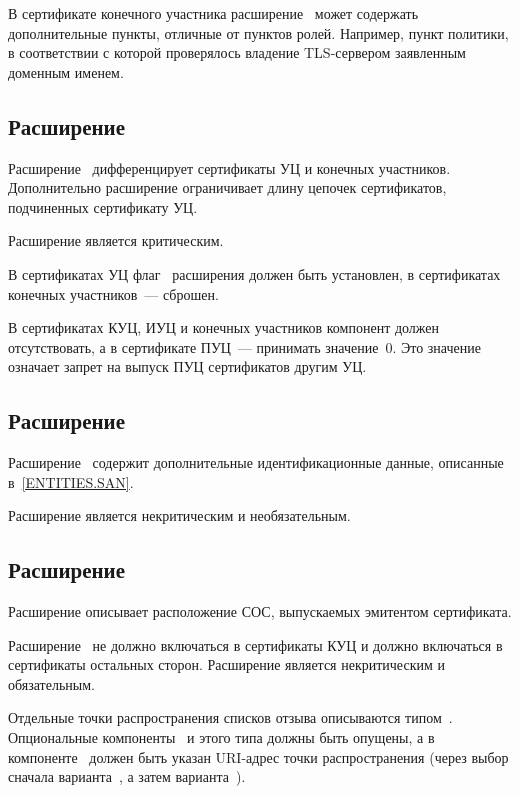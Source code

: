В сертификате конечного участника расширение~ может
содержать дополнительные пункты, отличные от пунктов ролей. Например, пункт
политики, в соответствии с которой проверялось владение TLS-сервером заявленным
доменным именем.

\subsection{Расширение }\label{FMT.Ext.BC}

Расширение~ дифференцирует сертификаты УЦ и
конечных участников. Дополнительно расширение ограничивает 
длину цепочек сертификатов, подчиненных сертификату УЦ.

Расширение  является критическим.

В сертификатах УЦ флаг~ расширения должен быть 
установлен, в сертификатах конечных участников~--- сброшен. 

В сертификатах КУЦ, ИУЦ и конечных участников компонент 
 должен отсутствовать,
а в сертификате ПУЦ~--- принимать значение~0. 
Это значение означает запрет на выпуск ПУЦ сертификатов 
другим УЦ. 

\subsection{Расширение }\label{FMT.Ext.SAN}

Расширение~ содержит дополнительные 
идентификационные данные, описанные в~\ref{ENTITIES.SAN}. 

Расширение является некритическим и необязательным.

\subsection{Расширение }\label{FMT.Ext.CDP}

Расширение  описывает расположение СОС, 
выпускаемых эмитентом сертификата. 

Расширение~ 
не должно включаться в сертификаты КУЦ и должно включаться в
сертификаты остальных сторон. Расширение является некритическим и обязательным.

Отдельные точки распространения списков отзыва описываются
типом~. Опциональные компоненты~ и
 этого типа должны быть опущены, а в
компоненте~ должен быть указан URI-адрес точки
распространения (через выбор сначала варианта~, а затем
варианта~).

